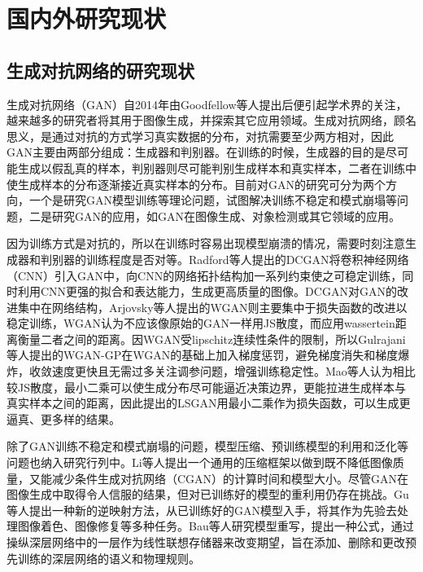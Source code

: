 \section{国内外研究现状}

\subsection{生成对抗网络的研究现状}
生成对抗网络（GAN）自2014年由Goodfellow等人\cite{goodfellow2014generative}提出后便引起学术界的关注，越来越多的研究者将其用于图像生成，并探索其它应用领域。生成对抗网络，顾名思义，是通过对抗的方式学习真实数据的分布，对抗需要至少两方相对，因此GAN主要由两部分组成：生成器和判别器。在训练的时候，生成器的目的是尽可能生成以假乱真的样本，判别器则尽可能判别生成样本和真实样本，二者在训练中使生成样本的分布逐渐接近真实样本的分布。目前对GAN的研究可分为两个方向，一个是研究GAN模型训练等理论问题，试图解决训练不稳定和模式崩塌等问题，二是研究GAN的应用，如GAN在图像生成、对象检测或其它领域的应用。

因为训练方式是对抗的，所以在训练时容易出现模型崩溃的情况，需要时刻注意生成器和判别器的训练程度是否对等。Radford等人\cite{radford2015unsupervised}提出的DCGAN将卷积神经网络（CNN）引入GAN中，向CNN的网络拓扑结构加一系列约束使之可稳定训练，同时利用CNN更强的拟合和表达能力，生成更高质量的图像。DCGAN对GAN的改进集中在网络结构，Arjovsky等人\cite{arjovsky2017wasserstein}提出的WGAN则主要集中于损失函数的改进以稳定训练，WGAN认为不应该像原始的GAN一样用JS散度，而应用wassertein距离衡量二者之间的距离。因WGAN受lipschitz连续性条件的限制，所以Gulrajani等人\cite{gulrajani2017improved}提出的WGAN-GP在WGAN的基础上加入梯度惩罚，避免梯度消失和梯度爆炸，收敛速度更快且无需过多关注调参问题，增强训练稳定性。Mao等人\cite{mao2017least}认为相比较JS散度，最小二乘可以使生成分布尽可能逼近决策边界，更能拉进生成样本与真实样本之间的距离，因此提出的LSGAN用最小二乘作为损失函数，可以生成更逼真、更多样的结果。

除了GAN训练不稳定和模式崩塌的问题，模型压缩、预训练模型的利用和泛化等问题也纳入研究行列中。Li等人\cite{li2020gan}提出一个通用的压缩框架以做到既不降低图像质量，又能减少条件生成对抗网络（CGAN\cite{mirza2014conditional}）的计算时间和模型大小。尽管GAN在图像生成中取得令人信服的结果，但对已训练好的模型的重利用仍存在挑战。Gu等人\cite{gu2020image}提出一种新的逆映射方法，从已训练好的GAN模型入手，将其作为先验去处理图像着色、图像修复等多种任务。Bau等人\cite{bau2020rewriting}研究模型重写，提出一种公式，通过操纵深层网络中的一层作为线性联想存储器来改变期望，旨在添加、删除和更改预先训练的深层网络的语义和物理规则。

